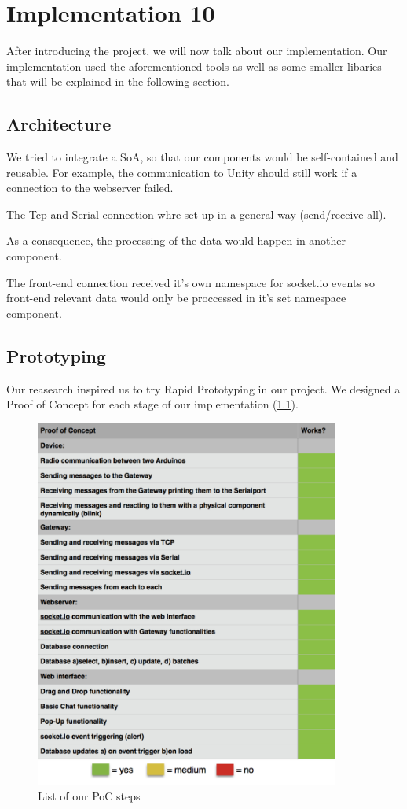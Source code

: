 
\chapter{Implementation 10} %
\label{Chapter3} %

After introducing the project, we will now talk about our implementation.
Our implementation used the aforementioned tools as well as some smaller libaries that will be explained in the following section.
\section{Architecture}
We tried to integrate a SoA, so that our components would be self-contained and reusable. 
For example, the communication to Unity should still work if a connection to the webserver failed.

The Tcp and Serial connection whre set-up in a general way (send/receive all). 

As a consequence, the processing of the data would happen in another component.

The front-end connection received it's own namespace for socket.io events so front-end relevant data 
would only be proccessed in it's set namespace component.
\section{Prototyping}
Our reasearch inspired us to try Rapid Prototyping in our project. 
We designed a Proof of Concept for each stage of our implementation (\ref{fig:PoC}).
\begin{figure}[th]
	\centering
	\includegraphics[width=100mm,scale=1]{Figures/PoC}
	\decoRule
	\caption[PoC]{List of our PoC steps}
	\label{fig:PoC}
\end{figure}

